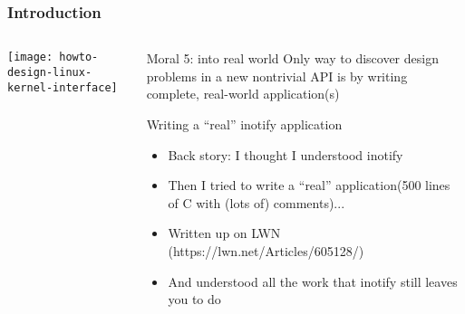 \begin{frame}[plain]
	\frametitle{Introduction}
	
	
	
	\begin{columns}
		
		\begin{column}{.4\textwidth}
			
			\texttt{[image: howto-design-linux-kernel-interface]}
			
		\end{column}
		
		\begin{column}{.6\textwidth}
			\Large
			\begin{block}{Moral 5: into real world}
				Only way to discover design
				problems in a new nontrivial API
				is by writing complete, real-world
				application(s)	
				
			\end{block} 
			
			\normalsize
			Writing a “real” inotify application
			
			
			\begin{itemize}
				\item Back story: I thought I understood inotify
				
				\item Then I tried to write a “real” application(500 lines of C with (lots of) comments)...
						
				\item Written up on LWN (https://lwn.net/Articles/605128/)
				
				
				\item And understood all the work that inotify still leaves you to do
				
				
			\end{itemize}
		\end{column}
		
		
	\end{columns}
	
	
\end{frame}



